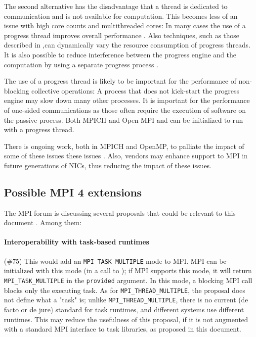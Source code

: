 \begin{enumerate}
			The second alternative has the disadvantage that a thread is 
			dedicated to communication and is not available for computation. 
			This becomes less of an issue with high core counts and 
			multithreaded cores: In many cases the use of a progress thread 
			improves overall performance \cite{vaidyanathan2015improving}. Also 
			techniques, such as 
			those described in 
			\cite{hoefler2008message,denis2014pioman},can dynamically vary the 
			resource 
			consumption of progress threads. It is also possible to reduce 
			interference between the progress engine and the computation by 
			using a separate progress process \cite{si2015casper}.
			
			The use of a progress thread is likely to be important for the 
			performance of non-blocking collective operations: A process that 
			does not kick-start the progress engine may slow down many other 
			processes. It is important for the performance of one-sided 
			communications as those often require the execution of software on 
			the passive process. Both MPICH and Open MPI and  can be 
			initialized to run with a progress thread.
		\end{enumerate}
	

There is ongoing work, both in MPICH and OpenMP, to palliate the impact of some 
of these issues
these issues \cite{balaji2008toward,mpicon2,mpi-thread,dang2017advanced}. Also, 
vendors may enhance support to 
MPI in 
future 
generations of NICs, thus reducing the impact of these issues. 
		
	\subsection{Possible MPI 4 extensions}
	The MPI forum is discussing several proposals that could be relevant to 
	this document \cite{MPI4}. Among them:
	
	\paragraph{Interoperability with task-based runtimes} (\#75) This would add 
	an \texttt{MPI\_TASK\_MULTIPLE} mode to MPI. MPI can be initialized with 
	this mode (in a call to ); if MPI supports this 
	mode, it will return \texttt{MPI\_TASK\_MULTIPLE} in the \texttt{provided} 
	argument. In this mode, a blocking MPI 
	call blocks only the executing task. As for 
	\texttt{MPI\_THREAD\_MULTIPLE}, the proposal does not define what a "task" 
	is; unlike  \texttt{MPI\_THREAD\_MULTIPLE}, there is no current (de facto 
	or de jure) standard for task runtimes, and different systems use different 
	runtimes. This may reduce the usefulness of this proposal, if it is not 
	augmented with a standard MPI interface to task libraries, as proposed in 
	this document.
	
